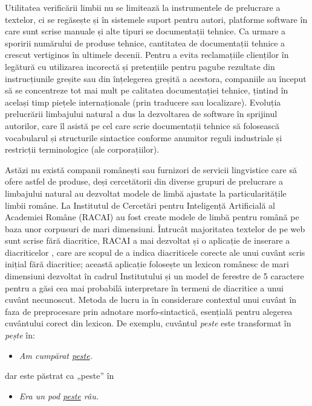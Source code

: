 \begin{multicols}{2}
Utilitatea verificării limbii nu se limitează la instrumentele de prelucrare a textelor, ci se regăsește și în sistemele suport pentru autori, platforme software în care sunt scrise manuale și alte tipuri se documentații tehnice. Ca urmare a sporirii numărului de produse tehnice, cantitatea de documentații tehnice a crescut vertiginos în ultimele decenii. Pentru a evita reclamațiile clienților în legătură cu utilizarea incorectă și pretențiile pentru pagube rezultate din instrucțiunile greșite sau din înțelegerea greșită a acestora, companiile au început să se concentreze tot mai mult pe calitatea documentației tehnice, țintind în același timp piețele internaționale (prin traducere sau localizare). Evoluția prelucrării limbajului natural a dus la dezvoltarea de software în sprijinul autorilor, care îl asistă pe cel care scrie documentații tehnice să folosească vocabularul și structurile sintactice conforme anumitor reguli industriale și restricții terminologice (ale corporațiilor).

Astăzi nu există companii românești sau furnizori de servicii lingvistice care să ofere astfel de produse, deși cercetătorii din diverse grupuri de prelucrare a limbajului natural au dezvoltat modele de limbă ajustate la particularitățile limbii române. La Institutul de Cercetări pentru Inteligență Artificială al Academiei Române (RACAI) au fost create modele de limbă pentru română pe baza unor corpusuri de mari dimensiuni. Întrucât majoritatea textelor de pe web sunt scrise fără diacritice, RACAI a mai dezvoltat și o aplicație de inserare a diacriticelor \cite{DIAC}, care are scopul de a indica diacriticele corecte ale unui cuvânt scris inițial fără diacritice; această aplicație folosește un lexicon românesc de mari dimensiuni dezvoltat în cadrul Institutului și un model de ferestre de 5 caractere pentru a găsi cea mai probabilă interpretare în termeni de diacritice a unui cuvânt necunoscut. Metoda de lucru ia în considerare contextul unui cuvânt în faza de preprocesare prin adnotare morfo-sintactică, esențială pentru alegerea cuvântului corect din lexicon. De exemplu, cuvântul \textit{peste} este transformat în \textit{pește} în:

\begin{itemize}
\item \textit{Am cumpărat \underline{peste}.}
\end{itemize}

dar este păstrat ca „peste” în

\begin{itemize}
\item \textit{Era un pod \underline{peste} râu. }
\end{itemize}


\end{multicols}
